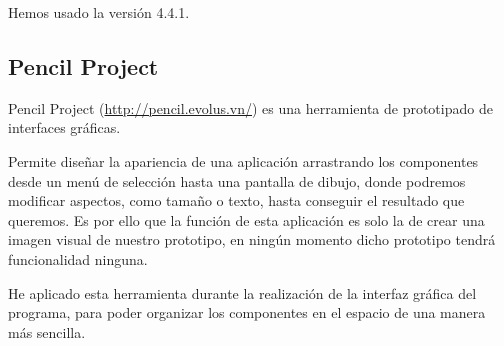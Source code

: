 Hemos usado la versión 4.4.1.

\subsection{Pencil Project}

Pencil Project (\url{http://pencil.evolus.vn/}) es una herramienta de prototipado de interfaces gráficas.

Permite diseñar la apariencia de una aplicación arrastrando los componentes desde un menú de selección hasta una pantalla de dibujo, donde podremos modificar aspectos, como tamaño o texto, hasta conseguir el resultado que queremos. Es por ello que la función de esta aplicación es solo la de crear una imagen visual de nuestro prototipo, en ningún momento dicho prototipo tendrá funcionalidad ninguna.

He aplicado esta herramienta durante la realización de la interfaz gráfica del programa, para poder organizar los componentes en el espacio de una manera más sencilla.

